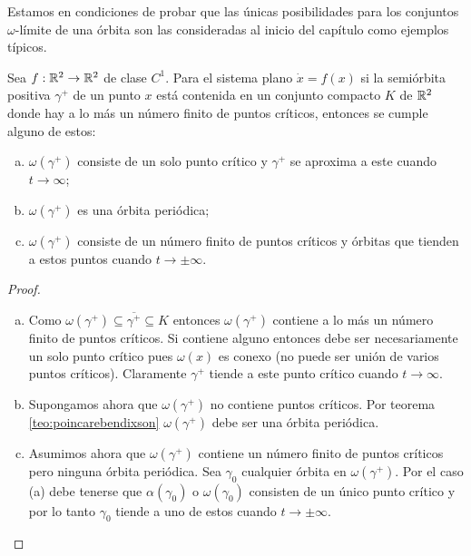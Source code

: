 Estamos en condiciones de probar que las únicas posibilidades para los conjuntos $\omega$-límite de una órbita son las consideradas al inicio del capítulo como ejemplos típicos.

\begin{corollary} \label{teo:poincarebendixson2} Sea $f: {\mathbb{R}}^2 \to {\ensuremath{\mathbb{R}}}^2$ de clase $C^1$. Para el sistema plano $\dot{x} = f(x)$ si la semiórbita positiva $\gamma^+$ de un punto $x$ está contenida en un conjunto compacto $K$ de ${\mathbb{R}}^2$ donde hay a lo más un número finito de puntos críticos, entonces se cumple alguno de estos:

	\begin{enumerate}[(a)]
		\item $\omega(\gamma^+)$ consiste de un solo punto crítico  y $\gamma^+$ se aproxima a este cuando $t \to \infty$;
		\item $\omega(\gamma^+)$ es una órbita periódica;
		\item $\omega(\gamma^+)$ consiste de un número finito de puntos críticos y órbitas que tienden a estos puntos cuando $t \to \pm \infty$.
	\end{enumerate}
\end{corollary}

\begin{proof}
\begin{enumerate}[(a)]
	\item Como $\omega(\gamma^+) \subseteq \overline{\gamma^+} \subseteq K$ entonces $\omega(\gamma^+)$ contiene a lo más un número finito de puntos críticos. Si contiene alguno entonces debe ser necesariamente un solo punto crítico pues $\omega(x)$ es conexo (no puede ser unión de varios puntos críticos). Claramente $\gamma^+$ tiende a este punto crítico cuando $t \to \infty$.
	\item Supongamos ahora que $\omega(\gamma^+)$ no contiene puntos críticos. Por teorema \ref{teo:poincarebendixson} $\omega(\gamma^+)$ debe ser una órbita periódica.
	\item Asumimos ahora que $\omega(\gamma^+)$ contiene un número finito de puntos críticos pero ninguna órbita periódica. Sea $\gamma_0$ cualquier órbita en $\omega(\gamma^+)$. Por el caso (a) debe tenerse que $\alpha(\gamma_0)$ o $\omega(\gamma_0)$ consisten de un único punto crítico y por lo tanto $\gamma_0$ tiende a uno de estos cuando $t \to \pm \infty$.
\end{enumerate}
\end{proof}

